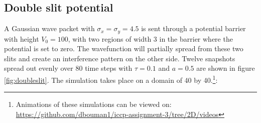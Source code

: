 \subsection*{Double slit potential}
A Gaussian wave packet with $\sigma_x = \sigma_y = 4.5$ is sent through a potential barrier with height $V_0 = 100$, with two regions of width 3 in the barrier where the potential is set to zero. The wavefunction will partially spread from these two slits and create an interference pattern on the other side. Twelve snapshots spread out evenly over 80 time steps with $\tau = 0.1$ and $a=0.5$ are shown in figure \ref{fig:doubleslit}. The simulation takes place on a domain of 40 by 40.\footnote{Animations of these simulations can be viewed on: \text{ }\url{https://github.com/dbouman1/iccp-assignment-3/tree/2D/videos}}:


%
\def\arraystretch{0.6}%
\setlength\tabcolsep{0.5mm}

